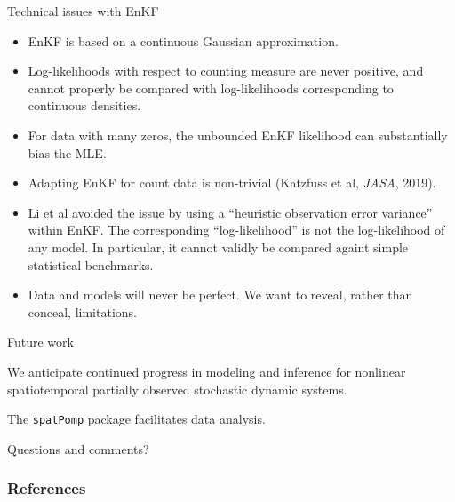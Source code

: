 \documentclass{beamer}
\begin{document}
\begin{frame}{Technical issues with EnKF}

  \begin{itemize}
  \item EnKF is based on a continuous Gaussian approximation.
  \item Log-likelihoods with respect to counting measure are never positive, and cannot properly be compared with log-likelihoods corresponding to continuous densities.
    \item For data with many zeros, the unbounded EnKF likelihood can substantially bias the MLE.
    \item Adapting EnKF for count data is non-trivial (Katzfuss et al, {\it JASA}, 2019).
    \item Li et al avoided the issue by using a ``heuristic observation error variance'' within EnKF. The corresponding ``log-likelihood'' is not the log-likelihood of any model. In particular, it cannot validly be compared againt simple statistical benchmarks.
  \item Data and models will never be perfect. We want to reveal, rather than conceal, limitations.
  \end{itemize}
  
  \end{frame}

\begin{frame}{Future work}

  \newcommand\futuresep{\vspace{5mm}}
  
  \begin{myitemize}

  \item We anticipate continued progress in modeling and inference for nonlinear spatiotemporal partially observed stochastic dynamic systems.

    \futuresep
    
  \item The \texttt{spatPomp} package facilitates data analysis.

    \futuresep

    \item Questions and comments?
    
\end{myitemize}

\end{frame}

\nocite{asfaw23arxiv,bjornstad01,breto19,grenfell04,he10,katzfuss19,ionides21,ionides22,lee20,li20,ng02,ning23-ibpf,park20,rebeschini15,wheeler23}

\begin{frame}[allowframebreaks]
\frametitle{References}


\end{frame}

\end{document}
